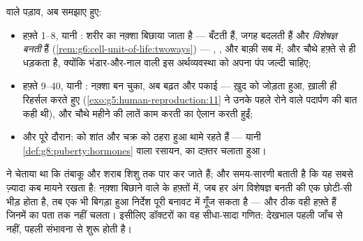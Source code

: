 \begin{proposition}[समय-सारणी, साज़ों के साथ दोबारा]\label{prop:g8:from-egg-to-birth:timetable}
 वाले पड़ाव, अब समझाए हुए:
\begin{itemize}
  \item हफ़्ते 1--8, यानी \emph{}: शरीर का नक़्शा बिछाया जाता है
        ---  बँटती हैं, जगह बदलती हैं और
        \emph{विशेषज्ञ बनती} हैं
        (\cref{rem:g6:cell-unit-of-life:twoways}) --- ,
        ,  और बाक़ी सब में; और  चौथे हफ़्ते से ही
        धड़कता है, क्योंकि भंडार-और-नाल वाली इस अर्थव्यवस्था को अपना
        पंप जल्दी चाहिए;
  \item हफ़्ते 9--40, यानी \emph{}: नक़्शा बन चुका, अब
        बढ़त और पकाई ---  ख़ुद को जोड़ता हुआ,  ख़ाली ही
        रिहर्सल करते हुए
        (\cref{exo:g5:human-reproduction:11} ने उनके पहले रोने वाले
        पदार्पण की बात कही थी), और चौथे महीने की लातें काम करती
         का ऐलान करती हुईं;
  \item और पूरे दौरान:   को शांत और चक्र को ठहरा हुआ
        थामे रहते हैं --- यानी \cref{def:g8:puberty:hormones} वाला
        रसायन,  का दफ़्तर चलाता हुआ।
\end{itemize}
\end{proposition}
\admitted

\begin{example}[शुरुआती हफ़्ते सबसे ज़्यादा देखभाल क्यों माँगते हैं]\label{ex:g8:from-egg-to-birth:earlycare}
 ने चेताया था कि तंबाकू और शराब
शिशु तक पार कर जाते हैं; और समय-सारणी बताती है कि यह सबसे ज़्यादा कब
मायने रखता है: नक़्शा बिछाने वाले  के हफ़्तों में, जब हर अंग
विशेषज्ञ बनती  की एक छोटी-सी भीड़ होता है, तब एक भी बिगड़ा हुआ
निर्देश पूरी बनावट में गूँज सकता है --- और ठीक वही हफ़्ते हैं जिनमें
 का पता तक नहीं चलता। इसीलिए डॉक्टरों का वह सीधा-सादा गणित:
देखभाल पहली जाँच से नहीं, पहली संभावना से शुरू होती है।
\end{example}

